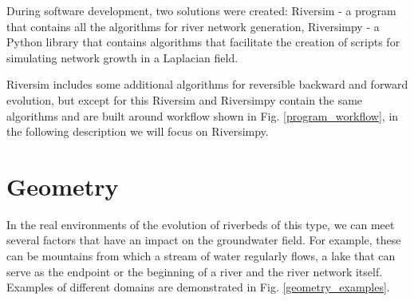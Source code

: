 \documentclass[]{pracamgr}
\begin{document}
    During software development, two solutions were created: Riversim\cite{Riversim} - a program that contains all the algorithms for river network generation, Riversimpy\cite{Riversimpy} - a Python library that contains algorithms that facilitate the creation of scripts for simulating network growth in a Laplacian field.
    
    Riversim includes some additional algorithms for reversible backward and forward evolution, but except for this Riversim and Riversimpy contain the same algorithms and are built around workflow shown in Fig. \ref{program_workflow}, in the following description we will focus on Riversimpy.

    \section{Geometry}
      
      In the real environments of the evolution of riverbeds of this type, we can meet several factors that have an impact on the groundwater field. For example, these can be mountains from which a stream of water regularly flows, a lake that can serve as the endpoint or the beginning of a river and the river network itself. Examples of different domains are demonstrated in Fig. \ref{geometry_examples}.
      
\end{document}
